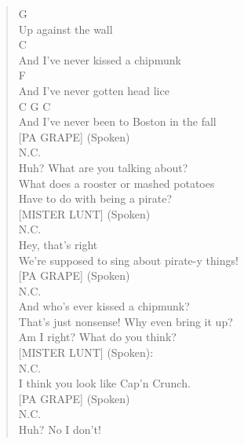 \documentclass[11pt]{article}
\begin{document}
\begin{verse}
G\\
Up against the wall\\
\hspace*{9em}C\\
And I've never kissed a chipmunk\\
\hspace*{9em}F\\
And I've never gotten head lice\\
\hspace*{9em}C             G             C\\
And I've never been to Boston in the fall\\
\vspace*{1em}
\vspace*{1em}
[PA GRAPE] (Spoken)\\
N.C.\\
Huh? What are you talking about?\\
What does a rooster or mashed potatoes\\
Have to do with being a pirate?\\
\vspace*{1em}
\vspace*{1em}
[MISTER LUNT] (Spoken)\\
N.C.\\
Hey, that's right\\
We're supposed to sing about pirate-y things!\\
\vspace*{1em}
\vspace*{1em}
[PA GRAPE] (Spoken)\\
N.C.\\
And who's ever kissed a chipmunk?\\
That's just nonsense! Why even bring it up?\\
Am I right? What do you think?\\
\vspace*{1em}
\vspace*{1em}
[MISTER LUNT] (Spoken):\\
N.C.\\
I think you look like Cap'n Crunch.\\
\vspace*{1em}
\vspace*{1em}
[PA GRAPE] (Spoken)\\
N.C.\\
Huh? No I don't!\\
\vspace*{1em}
\vspace*{1em}

\end{verse}
\end{document}
